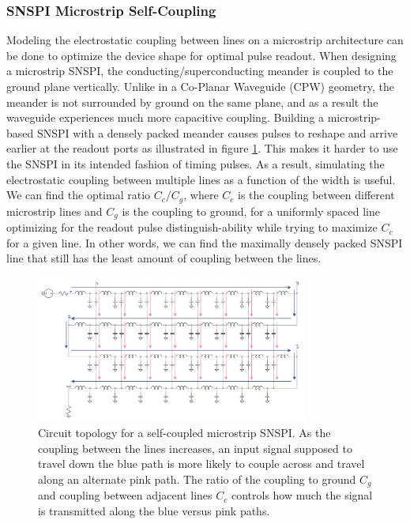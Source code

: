 \subsubsection{SNSPI Microstrip Self-Coupling}

Modeling the electrostatic coupling between lines on a microstrip architecture can be done
to optimize the device shape for optimal pulse readout. When designing a microstrip SNSPI, the
conducting/superconducting meander is coupled to the ground plane vertically. Unlike in a 
Co-Planar Waveguide (CPW) geometry, the meander is not surrounded by ground on the same plane, 
and as a result the waveguide experiences much more capacitive coupling. Building a 
microstrip-based SNSPI with a densely packed meander causes pulses to reshape and
arrive earlier at the readout ports as illustrated in figure \ref{fig:snspi_coupled}. 
This makes it harder to use the SNSPI in its intended
fashion of timing pulses. As a result, simulating the electrostatic coupling between multiple
lines as a function of the width is useful. We can find the optimal ratio $C_c/C_g$, where $C_c$
is the coupling between different microstrip lines and $C_g$ is the coupling to ground,
for a uniformly spaced line optimizing for the readout pulse distinguish-ability while trying to 
maximize $C_c$ for a given line. In other words, we can find the maximally densely packed 
SNSPI line that still has the least amount of coupling between the lines.

\begin{figure}
    \centering
    \includegraphics[width=0.8\textwidth]{figs/snspi_coupled.png}
    \caption{Circuit topology for a self-coupled microstrip SNSPI. As the coupling between
    the lines increases, an input signal supposed to travel down the blue path is more 
    likely to couple across and travel along an alternate pink path. The ratio of the coupling to ground $C_g$
    and coupling between adjacent lines $C_c$ controls how much the signal is transmitted along the blue
    versus pink paths.}
    \label{fig:snspi_coupled}
\end{figure}

